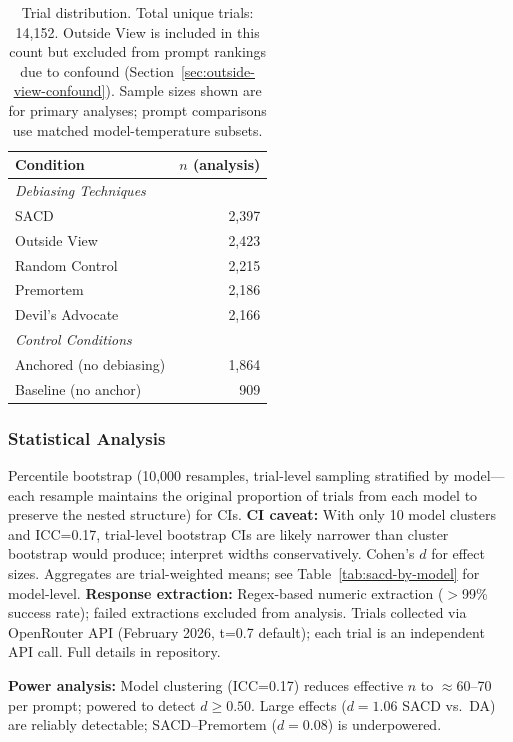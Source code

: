 \documentclass[11pt]{article}
\begin{document}
\begin{table}[H]
\centering
\caption{Trial distribution. Total unique trials: 14,152. Outside View is included in this count but excluded from prompt rankings due to confound (Section~\ref{sec:outside-view-confound}). Sample sizes shown are for primary analyses; prompt comparisons use matched model-temperature subsets.}
\label{tab:trial-counts}
\begin{tabular}{lr}
\toprule
Condition & $n$ (analysis) \\
\midrule
\multicolumn{2}{l}{\textit{Debiasing Techniques}} \\
\quad SACD & 2,397 \\
\quad Outside View & 2,423 \\
\quad Random Control & 2,215 \\
\quad Premortem & 2,186 \\
\quad Devil's Advocate & 2,166 \\
\midrule
\multicolumn{2}{l}{\textit{Control Conditions}} \\
\quad Anchored (no debiasing) & 1,864 \\
\quad Baseline (no anchor) & 909 \\
\bottomrule
\end{tabular}
\end{table}

\subsubsection{Statistical Analysis}

Percentile bootstrap (10,000 resamples, trial-level sampling stratified by model---each resample maintains the original proportion of trials from each model to preserve the nested structure) for CIs. \textbf{CI caveat:} With only 10 model clusters and ICC=0.17, trial-level bootstrap CIs are likely narrower than cluster bootstrap would produce; interpret widths conservatively. Cohen's $d$ for effect sizes. Aggregates are trial-weighted means; see Table~\ref{tab:sacd-by-model} for model-level. \textbf{Response extraction:} Regex-based numeric extraction ($>$99\% success rate); failed extractions excluded from analysis. Trials collected via OpenRouter API (February 2026, t=0.7 default); each trial is an independent API call. Full details in repository.

\textbf{Power analysis:} Model clustering (ICC=0.17) reduces effective $n$ to $\approx$60--70 per prompt; powered to detect $d \geq 0.50$. Large effects ($d = 1.06$ SACD vs.\ DA) are reliably detectable; SACD--Premortem ($d = 0.08$) is underpowered.
\end{document}
